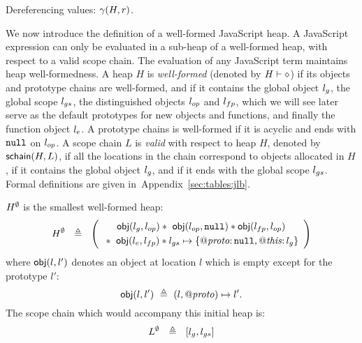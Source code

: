 \documentclass{article}
\newcommand{\iflong}[1]{#1}
\newcommand{\ifshort}[1]{}
\begin{document}
%
%
\begin{display}{Dereferencing values: $\gamma(H,r)$.}
~
~
\end{display}



%
%
We now introduce the definition of a well-formed JavaScript heap. A JavaScript
expression can only be evaluated in a sub-heap of a well-formed heap,
with respect to a valid scope chain. The evaluation of any JavaScript term 
maintains heap well-formedness.
%
A heap $H$ is \emph{well-formed} (denoted by $H\vdash\diamond$) if its objects
and prototype chains are well-formed, and if it contains the global object $l_g$, the global scope $l_{gs}$, the
distinguished objects $l_{op}$ and $l_{fp}$, which we will see
later serve as the default prototypes for new objects and functions, and finally the  function object $l_{e}$.
%
A prototype chains is well-formed if it is acyclic and ends with $\mbox{\texttt{{\upshape null}}}$ on $l_{op}$.
%
A scope chain $L$ is \emph{valid} with respect to heap $H$, denoted by
$\mathsf{schain}(H,L)$,  if all the locations in the chain correspond to
objects allocated in $H$, if it contains the global object $l_g$, and if it ends with the global scope $l_{gs}$.
%
Formal definitions are given in~\ifshort{\cite{proofs}.}\iflong{Appendix~\ref{sec:tables:jlb}.}
  
%
$H^{\emptyset}$ is the smallest well-formed heap:
%
\[
H^{\emptyset} ~~\triangleq~~ \left(
\begin{array}{c} 
  \mathsf{obj}(l_g,l_{op}) \mathbin{*}\ \mathsf{obj}(l_{op},\mbox{\texttt{{\upshape null}}}) \mathbin{*} \mathsf{obj}(l_{fp},l_{op})\\[1mm]
  {}\mathbin{*}\ \mathsf{obj}(l_{e},l_{fp})
  \mathbin{*} l_{gs}\mapsto\{\mathit{@proto}{:\,}\mbox{\texttt{{\upshape null}}},\mathit{@this}{:\,}l_g\}
\end{array}\right)
\]
%
where $\mathsf{obj}(l,l')$ denotes an object at location $l$ which is empty except for the  prototype $l'$:
\[\mathsf{obj}(l,l')\ \triangleq\ (l,\mathit{@proto})\mapsto l'.\]
%
The scope chain which would accompany this initial heap is:
%
\[
L^{\emptyset} ~~\triangleq~~ [l_g,l_{gs}]
\]
\end{document}

